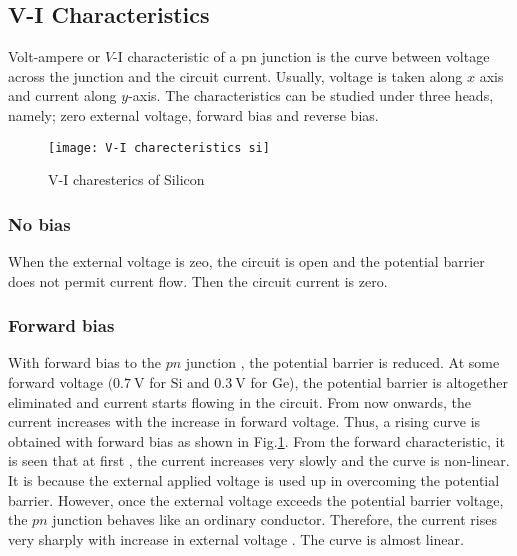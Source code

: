 \subsection{V-I Characteristics}
Volt-ampere or $V$-I characteristic of a pn junction is the curve between voltage across the junction and the circuit current. Usually, voltage is taken along $x$ axis and current along $y$-axis. The characteristics can be studied under three heads, namely; zero external voltage, forward bias and reverse bias.
\begin{figure}[H]
	\centering
	\texttt{[image: V-I charecteristics si]}
	\caption{V-I charesterics of Silicon}
	\label{V-I characterics of Silicon}
\end{figure}
\subsubsection{No bias}
 When the external voltage is zeo, the circuit is open and the potential barrier does not permit current flow. Then the circuit current is zero.
\subsubsection{Forward bias}
 With forward bias to the $p n$ junction , the potential barrier is reduced. At some forward voltage $(0.7 \mathrm{~V}$ for $\mathrm{Si}$ and $0.3 \mathrm{~V}$ for Ge), the potential barrier is altogether eliminated and current starts flowing in the circuit. From now onwards, the current increases with the increase in forward voltage. Thus, a rising curve  is obtained with forward bias as shown in Fig.\ref{V-I characterics of Silicon}. From the forward characteristic, it is seen that at first , the current increases very slowly and the curve is non-linear. It is because the external applied voltage is used up in overcoming the potential barrier. However, once the external voltage exceeds the potential barrier voltage, the $p n$ junction behaves like an ordinary conductor. Therefore, the current rises very sharply with increase in external voltage . The curve is almost linear.
